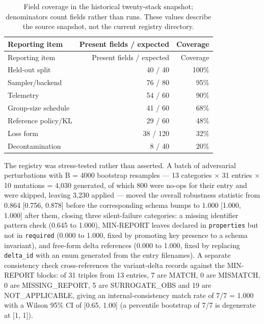 \documentclass[12pt,a4paper]{report}
\begin{document}
\begin{longtable}[]{@{}lrr@{}}
\caption{Field coverage in the historical twenty-stack snapshot;
denominators count fields rather than runs. These values describe the
source snapshot, not the current registry directory.}\tabularnewline
\toprule\noalign{}
Reporting item & Present fields / expected & Coverage \\
\midrule\noalign{}
\endfirsthead
\toprule\noalign{}
Reporting item & Present fields / expected & Coverage \\
\midrule\noalign{}
\endhead
\bottomrule\noalign{}
\endlastfoot
Held-out split & 40 / 40 & 100\% \\
Sampler/backend & 76 / 80 & 95\% \\
Telemetry & 54 / 60 & 90\% \\
Group-size schedule & 41 / 60 & 68\% \\
Reference policy/KL & 29 / 60 & 48\% \\
Loss form & 38 / 120 & 32\% \\
Decontamination & 8 / 40 & 20\% \\
\end{longtable}

The registry was stress-tested rather than asserted. A batch of
adversarial perturbations with B = 4000 bootstrap resamples --- 13
categories × 31 entries × 10 mutations = 4,030 generated, of which 800
were no-ops for their entry and were skipped, leaving 3,230 applied ---
moved the overall robustness statistic from 0.864 {[}0.756, 0.878{]}
before the corresponding schema bumps to 1.000 {[}1.000, 1.000{]} after
them, closing three silent-failure categories: a missing identifier
pattern check (0.645 to 1.000), MIN-REPORT leaves declared in
\texttt{properties} but not in \texttt{required} (0.000 to 1.000, fixed
by promoting key presence to a schema invariant), and free-form delta
references (0.000 to 1.000, fixed by replacing \texttt{delta\_id} with
an enum generated from the entry filenames). A separate consistency
check cross-references the variant-delta records against the MIN-REPORT
blocks: of 31 triples from 13 entries, 7 are MATCH, 0 are MISMATCH, 0
are MISSING\_REPORT, 5 are SURROGATE\_OBS and 19 are NOT\_APPLICABLE,
giving an internal-consistency match rate of 7/7 = 1.000 with a Wilson
95\% CI of {[}0.65, 1.00{]} (a percentile bootstrap of 7/7 is degenerate
at {[}1, 1{]}).
\end{document}
